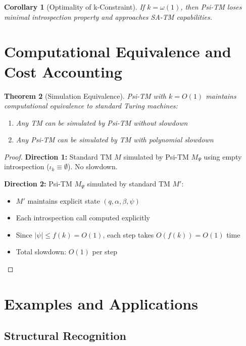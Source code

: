 \documentclass[11pt]{article}
\newtheorem{theorem}{Theorem}[section]
\newtheorem{corollary}[theorem]{Corollary}
\theoremstyle{definition}
\begin{document}
\begin{corollary}[Optimality of k-Constraint]
If $k = \omega(1)$, then Psi-TM loses minimal introspection property and approaches SA-TM capabilities.
\end{corollary}

\section{Computational Equivalence and Cost Accounting}

\begin{theorem}[Simulation Equivalence]
\label{thm:equivalence}
Psi-TM with $k = O(1)$ maintains computational equivalence to standard Turing machines:
\begin{enumerate}
\item Any TM can be simulated by Psi-TM without slowdown
\item Any Psi-TM can be simulated by TM with polynomial slowdown
\end{enumerate}
\end{theorem}

\begin{proof}
\textbf{Direction 1:} Standard TM $M$ simulated by Psi-TM $M_\Psi$ using empty introspection ($\iota_k \equiv \emptyset$). No slowdown.

\textbf{Direction 2:} Psi-TM $M_\Psi$ simulated by standard TM $M'$:
\begin{itemize}
\item $M'$ maintains explicit state $(q, \alpha, \beta, \psi)$ 
\item Each introspection call computed explicitly
\item Since $|\psi| \leq f(k) = O(1)$, each step takes $O(f(k)) = O(1)$ time
\item Total slowdown: $O(1)$ per step
\end{itemize}
\end{proof}


\section{Examples and Applications}

\subsection{Structural Recognition}
\end{document}
